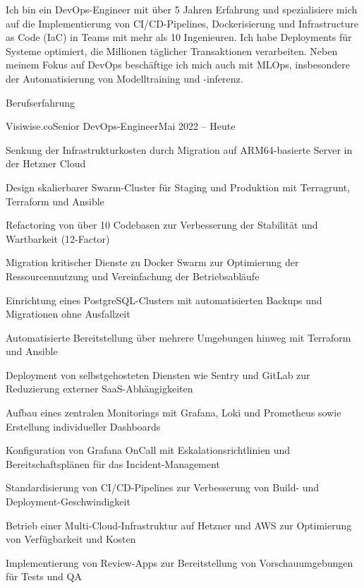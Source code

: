 \documentclass[]{main}
\begin{document}
\resumeheader
{}
{}
{}
{}
{}
{}

Ich bin ein DevOps-Engineer mit über 5 Jahren Erfahrung und spezialisiere mich auf die Implementierung von CI/CD-Pipelines, Dockerisierung und Infrastructure as Code (IaC) in Teams mit mehr als 10 Ingenieuren. Ich habe Deployments für Systeme optimiert, die Millionen täglicher Transaktionen verarbeiten. Neben meinem Fokus auf DevOps beschäftige ich mich auch mit MLOps, insbesondere der Automatisierung von Modelltraining und -inferenz.

\begin{section}{Berufserfahrung}
 \begin{subsection}{Visiwise.co}{Senior DevOps-Engineer}{Mai 2022 -- Heute}{}
     \item Senkung der Infrastrukturkosten durch Migration auf ARM64-basierte Server in der Hetzner Cloud
     \item Design skalierbarer Swarm-Cluster für Staging und Produktion mit Terragrunt, Terraform und Ansible
     \item Refactoring von über 10 Codebasen zur Verbesserung der Stabilität und Wartbarkeit (12-Factor)
     \item Migration kritischer Dienste zu Docker Swarm zur Optimierung der Ressourcennutzung und Vereinfachung der Betriebsabläufe
     \item Einrichtung eines PostgreSQL-Clusters mit automatisierten Backups und Migrationen ohne Ausfallzeit
     \item Automatisierte Bereitstellung über mehrere Umgebungen hinweg mit Terraform und Ansible
     \item Deployment von selbstgehosteten Diensten wie Sentry und GitLab zur Reduzierung externer SaaS-Abhängigkeiten
     \item Aufbau eines zentralen Monitorings mit Grafana, Loki und Prometheus sowie Erstellung individueller Dashboards
     \item Konfiguration von Grafana OnCall mit Eskalationsrichtlinien und Bereitschaftsplänen für das Incident-Management
     \item Standardisierung von CI/CD-Pipelines zur Verbesserung von Build- und Deployment-Geschwindigkeit
     \item Betrieb einer Multi-Cloud-Infrastruktur auf Hetzner und AWS zur Optimierung von Verfügbarkeit und Kosten
     \item Implementierung von Review-Apps zur Bereitstellung von Vorschauumgebungen für Tests und QA
 \end{subsection}


\end{section}
\end{document}
